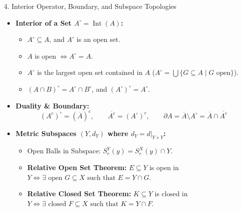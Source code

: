 \documentclass[11pt,a4paper]{article}
\begin{document}
\begin{formulabox}{4. Interior Operator, Boundary, and Subspace Topologies}
\begin{itemize}
    \item \textbf{Interior of a Set $A^\circ = \operatorname{Int}(A)$:}
    \begin{itemize}
        \item $A^\circ \subseteq A$, and $A^\circ$ is an open set.
        \item $A$ is open $\iff A^\circ = A$.
        \item $A^\circ$ is the largest open set contained in $A$ ($A^\circ = \bigcup \{G \subseteq A \mid G \text{ open}\}$).
        \item $(A \cap B)^\circ = A^\circ \cap B^\circ$, and $(A^\circ)^\circ = A^\circ$.
    \end{itemize}
    \item \textbf{Duality \& Boundary:}
    \begin{equation*}
        (A^c)^\circ = (\overline{A})^c, \qquad \overline{A^c} = (A^\circ)^c, \qquad \partial A = \overline{A} \setminus A^\circ = \overline{A} \cap \overline{A^c}
    \end{equation*}
    \item \textbf{Metric Subspaces $(Y, d_Y)$ where $d_Y = d|_{Y \times Y}$:}
    \begin{itemize}
        \item Open Balls in Subspace: $S_r^Y(y) = S_r^X(y) \cap Y$.
        \item \textbf{Relative Open Set Theorem:} $E \subseteq Y$ is open in $Y \iff \exists \text{ open } G \subseteq X \text{ such that } E = Y \cap G$.
        \item \textbf{Relative Closed Set Theorem:} $K \subseteq Y$ is closed in $Y \iff \exists \text{ closed } F \subseteq X \text{ such that } K = Y \cap F$.
    \end{itemize}
\end{itemize}
\end{formulabox}
\end{document}
